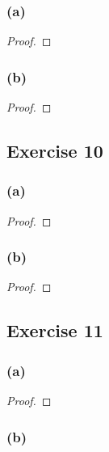 \documentclass[14pt]{extarticle}
\begin{document}
\subsubsection{(a)}

\begin{proof}

\end{proof}

\subsubsection{(b)}

\begin{proof}

\end{proof}

\subsection{Exercise 10}

\subsubsection{(a)}

\begin{proof}

\end{proof}

\subsubsection{(b)}

\begin{proof}

\end{proof}

\subsection{Exercise 11}

\subsubsection{(a)}

\begin{proof}

\end{proof}

\subsubsection{(b)}
\end{document}
